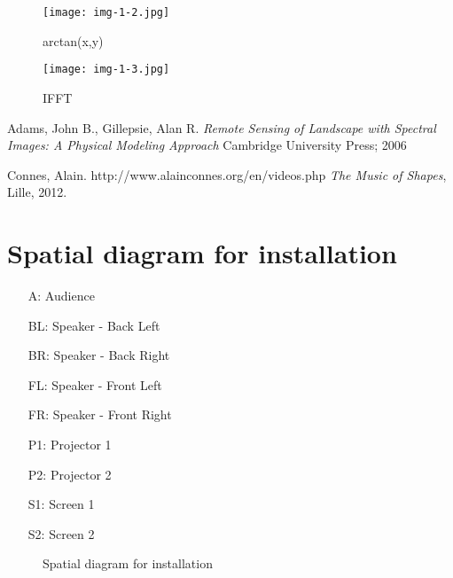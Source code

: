 \documentclass{article}
\begin{document}
\begin{figure}[htbp]
\begin{center}
\texttt{[image: img-1-2.jpg]}
\caption{arctan(x,y)}
\label{fig:phase}
\end{center}
\end{figure}


\begin{figure}[htbp]
\begin{center}
\texttt{[image: img-1-3.jpg]}
\caption{IFFT}
\label{fig:ifft}
\end{center}
\end{figure}

\fi


\begin{thebibliography}{10}

Adams, John B., Gillepsie, Alan R.
\newblock
\emph{Remote Sensing of Landscape with Spectral Images: A Physical Modeling Approach}
\newblock
Cambridge University Press; 2006


Connes, Alain.
\newblock
http://www.alainconnes.org/en/videos.php
\newblock
\emph{The Music of Shapes}, Lille, 2012.

\end{thebibliography}


\newpage

\section{Spatial diagram for installation}
\begin{itemize}
\item [A:] Audience
\item [BL:] Speaker - Back Left
\item [BR:] Speaker - Back Right
\item [FL:] Speaker - Front Left
\item [FR:] Speaker - Front Right
\item [P1:] Projector 1
\item [P2:] Projector 2
\item [S1:] Screen 1
\item [S2:] Screen 2
\end{itemize}



\begin{figure}
\centering
{}
\caption{Spatial diagram for installation}
\end{figure}
\end{document}
